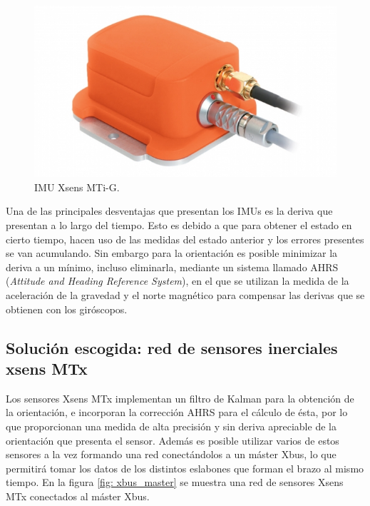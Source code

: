 \documentclass[12pt, a4paper]{report}
\begin{document}
\begin{figure}
  \begin{center}
    \includegraphics[scale=0.4]{../img/xsens_mti-g.png} 
  \end{center}
  \caption[IMU Xsens MTi-G]{IMU Xsens MTi-G.}
  \label{fig: xsens_mtig}
\end{figure}

Una de las principales desventajas que presentan los IMUs es la deriva que presentan a lo largo del tiempo. Esto es debido a que para obtener el estado en cierto tiempo, hacen uso de las medidas del estado anterior y los errores presentes se van acumulando. Sin embargo para la orientación es posible minimizar la deriva a un mínimo, incluso eliminarla, mediante un sistema llamado AHRS (\textit{Attitude and Heading Reference System}), en el que se utilizan la medida de la aceleración de la gravedad y el norte magnético para compensar las derivas que se obtienen con los giróscopos.

\subsection{Solución escogida: red de sensores inerciales xsens MTx}

Los sensores Xsens MTx implementan un filtro de Kalman para la obtención de la orientación, e incorporan la corrección AHRS para el cálculo de ésta, por lo que proporcionan una medida de alta precisión y sin deriva apreciable de la orientación que presenta el sensor. Además es posible utilizar varios de estos sensores a la vez formando una red conectándolos a un máster Xbus, lo que permitirá tomar los datos de los distintos eslabones que forman el brazo al mismo tiempo. En la figura \ref{fig: xbus_master} se muestra una red de sensores Xsens MTx conectados al máster Xbus.
\end{document}
